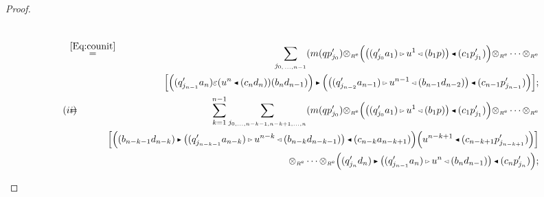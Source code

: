 \documentclass[reqno, a4paper, 10pt]{amsart}
\numberwithin{equation}{section}
\theoremstyle{plain}
\theoremstyle{definition}
\theoremstyle{remark}
\begin{document}
\begin{proof}
\begin{footnotesize}
\begin{eqnarray*}
\\
\!\!\!\!
 &\!\!\!\!\!\!\overset{\eqref{Eq:counit}}{=} &\!\!\!\!\!\!
  \underset{j_{0,\, \ldots,n-1}}{\sum}  (m(qp_{j_0}') {\otimes_{\scriptscriptstyle{{\scriptscriptstyle{{R^{\rm e}}}}}}}\Big( {\big( {(q_{j_0}'a_1){{\,\raise1pt\hbox{$\scriptscriptstyle{\rhd}$} \, }} u^1{{\,\raise1pt\hbox{$\scriptscriptstyle{\lhd}$} \, }}(b_1p)} \big)}{{\,\raise1pt\hbox{$\scriptscriptstyle{\blacktriangleleft}$} \, }} (c_1p_{j_1}')\Big) {\otimes_{\scriptscriptstyle{{\scriptscriptstyle{{R^{\rm e}}}}}}}\cdots  {\otimes_{\scriptscriptstyle{{\scriptscriptstyle{{R^{\rm e}}}}}}} \\ & & {\left[\underset{}{} {\Big((q_{j_{n-1}}'a_{n}) \varepsilon( u^n{{\,\raise1pt\hbox{$\scriptscriptstyle{\blacktriangleleft}$} \, }}(c_nd_n))(b_nd_{n-1})\Big) {{\,\raise1pt\hbox{$\scriptscriptstyle{\blacktriangleright}$} \, }} \Big( {\big( {(q_{j_{n-2}}'a_{n-1}){{\,\raise1pt\hbox{$\scriptscriptstyle{\rhd}$} \, }} u^{n-1}{{\,\raise1pt\hbox{$\scriptscriptstyle{\lhd}$} \, }}(b_{n-1}d_{n-2})} \big)}{{\,\raise1pt\hbox{$\scriptscriptstyle{\blacktriangleleft}$} \, }}(c_{n-1}p_{j_{n-1}}') \Big)} \right]};
\\
(ii) &\!\!\!\!\!\!=&\!\!\!\!\!\!
 \sum_{k=1}^{n-1}\underset{j_{0,\ldots,{n-k-1},{n-k+1},\ldots,{n}}}{\sum}(m(qp_{j_0}'){\otimes_{\scriptscriptstyle{{\scriptscriptstyle{{R^{\rm e}}}}}}}\Big( {\big( {(q_{j_0}'a_1){{\,\raise1pt\hbox{$\scriptscriptstyle{\rhd}$} \, }} u^1{{\,\raise1pt\hbox{$\scriptscriptstyle{\lhd}$} \, }}(b_1p)} \big)}{{\,\raise1pt\hbox{$\scriptscriptstyle{\blacktriangleleft}$} \, }} (c_1p_{j_1}')\Big)   {\otimes_{\scriptscriptstyle{{\scriptscriptstyle{{R^{\rm e}}}}}}}\cdots {\otimes_{\scriptscriptstyle{{\scriptscriptstyle{{R^{\rm e}}}}}}} \\ 
&\!\!\!\!\!\!\!\!\!\!\!&\!\!\!\!\!\!\!\!\!\!\! {\left[\underset{}{} {  \Big( (b_{n-k-1}d_{n-k}){{\,\raise1pt\hbox{$\scriptscriptstyle{\blacktriangleright}$} \, }} {\big( {(q_{j_{n-k-1}}'a_{n-k}){{\,\raise1pt\hbox{$\scriptscriptstyle{\rhd}$} \, }} u^{n-k} {{\,\raise1pt\hbox{$\scriptscriptstyle{\lhd}$} \, }} (b_{n-k}d_{n-k-1})} \big)}{{\,\raise1pt\hbox{$\scriptscriptstyle{\blacktriangleleft}$} \, }} (c_{n-k}a_{n-k+1})\Big)   \Big( u^{n-k+1} {{\,\raise1pt\hbox{$\scriptscriptstyle{\blacktriangleleft}$} \, }}(c_{n-k+1}p_{j_{n-k+1}}')\Big) } \right]} \\
&\!\!\!\!\!\!&\!\!\!\!\!\! \qquad \qquad 
{\otimes_{\scriptscriptstyle{{\scriptscriptstyle{{R^{\rm e}}}}}}}\cdots {\otimes_{\scriptscriptstyle{{\scriptscriptstyle{{R^{\rm e}}}}}}} 
\Big((q_{j_n}'d_n) {{\,\raise1pt\hbox{$\scriptscriptstyle{\blacktriangleright}$} \, }} {\big( {(q_{j_{n-1}}'a_n){{\,\raise1pt\hbox{$\scriptscriptstyle{\rhd}$} \, }} u^{n}{{\,\raise1pt\hbox{$\scriptscriptstyle{\lhd}$} \, }}(b_nd_{n-1})} \big)}{{\,\raise1pt\hbox{$\scriptscriptstyle{\blacktriangleleft}$} \, }} (c_np_{j_n}')\Big); \\

\end{eqnarray*}
\end{footnotesize}
\end{proof}
\end{document}
